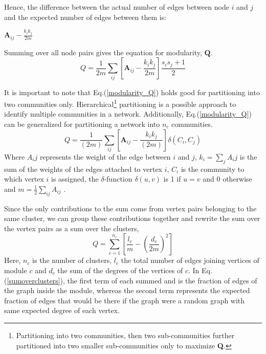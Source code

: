 {Hence, the difference between the actual number of edges between node $i$ and $j$ and the expected number of edges between them is:

\begin{center}
	$\textbf{A}_{ij} - \frac{k_i k_j}{2m}$
\end{center}

Summing over all node pairs gives the equation for modularity, $\textbf{Q}$.
\begin{equation}\label{modularity_Q}
Q = \dfrac{1}{2m} \sum\limits_{ij}\left[\textbf{A}_{ij} - \dfrac{k_i k_j}{2m}\right] \dfrac{s_i s_j + 1}{2}
\end{equation}

It is important to note that Eq.(\ref{modularity_Q}) holds good for partitioning into two communities only. Hierarchical\footnote{Partitioning into two communities, then two sub-communities further partitioned into two smaller sub-communities only to maximize \textbf{Q}.} partitioning is a possible approach to identify multiple communities in a network. Additionally, Eq.(\ref{modularity_Q}) can be generalized for partitioning a network into $n_c$ communities.
\begin{equation}
Q = \dfrac{1}{(2m)} \sum\limits_{ij}\left[\textbf{A}_{ij} - \dfrac{k_i k_j}{(2m)}\right] \delta(C_i, C_j)
\end{equation}
Where $A_ij$ represents the weight of the edge between $i$ and $j$, $k_i = \sum_j A_ij$ is the sum of the weights of the edges attached to vertex $i$, $C_i$ is the community to which vertex $i$ is assigned, the $\delta$-function $\delta(u,v)$ is 1 if $u = v$ and 0 otherwise and $m = \frac{1}{2} \sum_{ij}A_{ij}$ \cite{ref-27}.
 
Since the only contributions to the sum come from vertex pairs belonging to the same cluster, we can group these contributions together and rewrite the sum over the vertex pairs as a sum over the clusters,
\begin{equation}\label{sumoverclusters}
Q = \sum\limits_{c=1}^{n_c} \left[ \dfrac{l_c}{m} - \left( \dfrac{d_c}{2m}\right)^2\right]
\end{equation}
Here, $n_c$ is the number of clusters, $l_c$ the total number of edges joining vertices of module $c$ and $d_c$ the sum of the degrees of the vertices of $c$. In Eq.(\ref{sumoverclusters}), the first term of each summed and is the fraction of edges of the graph inside the module, whereas the second term represents the expected fraction of edges that would be there if the graph were a random graph with same expected degree of each vertex.

}
